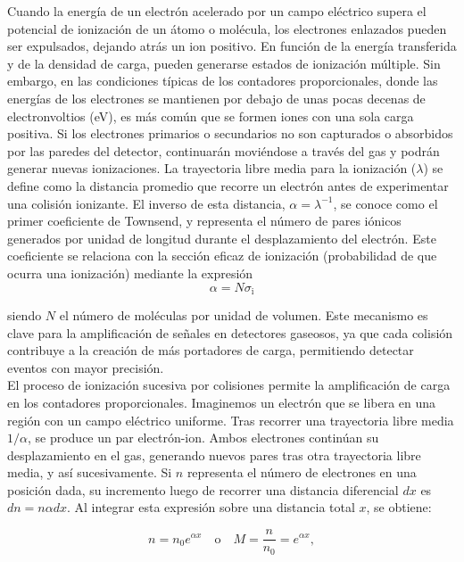 \documentclass{article}
\begin{document}
\noindent Cuando la energía de un electrón acelerado por un campo eléctrico supera el potencial de ionización de un átomo o molécula, los electrones enlazados pueden ser expulsados, dejando atrás un ion positivo. En función de la energía transferida y de la densidad de carga, pueden generarse estados de ionización múltiple. Sin embargo, en las condiciones típicas de los contadores proporcionales, donde las energías de los electrones se mantienen por debajo de unas pocas decenas de electronvoltios (eV), es más común que se formen iones con una sola carga positiva. Si los electrones primarios o secundarios no son capturados o absorbidos por las paredes del detector, continuarán moviéndose a través del gas y podrán generar nuevas ionizaciones. La trayectoria libre media para la ionización ($\lambda$) se define como la distancia promedio que recorre un electrón antes de experimentar una colisión ionizante. El inverso de esta distancia, $\alpha = \lambda ^{-1}$, se conoce como el primer coeficiente de Townsend, y representa el número de pares iónicos generados por unidad de longitud durante el desplazamiento del electrón. Este coeficiente se relaciona con la sección eficaz de ionización (probabilidad de que ocurra una ionización) mediante la expresión 
\begin{equation}
    \alpha=N \sigma_{\mathrm{i}}
\end{equation}

\noindent siendo $N$ el número de moléculas por unidad de volumen. Este mecanismo es clave para la amplificación de señales en detectores gaseosos, ya que cada colisión contribuye a la creación de más portadores de carga, permitiendo detectar eventos con mayor precisión.\\

\noindent El proceso de ionización sucesiva por colisiones permite la amplificación de carga en los contadores proporcionales. Imaginemos un electrón que se libera en una región con un campo eléctrico uniforme. Tras recorrer una trayectoria libre media $1/\alpha$, se produce un par electrón-ion. Ambos electrones continúan su desplazamiento en el gas, generando nuevos pares tras otra trayectoria libre media, y así sucesivamente. Si $n$ representa el número de electrones en una posición dada, su incremento luego de recorrer una distancia diferencial $dx$ es $dn = n \alpha dx$. Al integrar esta expresión sobre una distancia total $x$, se obtiene:

\begin{equation}
n = n_0 e^{\alpha x} \quad \text{o} \quad M = \frac{n}{n_0} = e^{\alpha x},
\label{eq:multiplication}
\end{equation}
\end{document}
